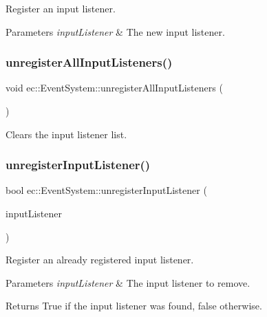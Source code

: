 Register an input listener. 


\begin{DoxyParams}{Parameters}
{\em input\+Listener} & The new input listener. \\
\hline
\end{DoxyParams}
\mbox{\label{classec_1_1_event_system_a142264d74594a6584fd06a00eec45345}} 
\subsubsection{\texorpdfstring{unregister\+All\+Input\+Listeners()}{unregisterAllInputListeners()}}
{\footnotesize\ttfamily void ec\+::\+Event\+System\+::unregister\+All\+Input\+Listeners (\begin{DoxyParamCaption}{ }\end{DoxyParamCaption})}



Clears the input listener list. 

\mbox{\label{classec_1_1_event_system_a6b76350de7e412e8df412b8c5bfd5b03}} 
\subsubsection{\texorpdfstring{unregister\+Input\+Listener()}{unregisterInputListener()}}
{\footnotesize\ttfamily bool ec\+::\+Event\+System\+::unregister\+Input\+Listener (\begin{DoxyParamCaption}\item[{\mbox{\hyperlink{classec_1_1_input_listener}{Input\+Listener}} $\ast$}]{input\+Listener }\end{DoxyParamCaption})}



Register an already registered input listener. 


\begin{DoxyParams}{Parameters}
{\em input\+Listener} & The input listener to remove. \\
\hline
\end{DoxyParams}
\begin{DoxyReturn}{Returns}
True if the input listener was found, false otherwise. 
\end{DoxyReturn}



